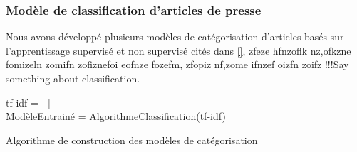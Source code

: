 \begin{enumerate}
                
                
               
                
                
                
                
                
        \end{enumerate}
        \subsubsection{Modèle de classification d'articles de presse}
            Nous avons développé plusieurs modèles de catégorisation d'articles basés sur l'apprentissage supervisé et non supervisé cités dans \autoref{},  zfeze hfnzoflk nz,ofkzne fomizeln zomifn zofiznefoi eofnze fozefm, zfopiz nf,zome ifnzef oizfn zoifz !!!Say something about classification.

            \begin{algorithm2e}[H]
            \SetAlgoLined
            tf-idf = [ ]\\
            ModèleEntrainé = AlgorithmeClassification(tf-idf)\\
            \caption{Algorithme de construction des modèles de catégorisation}
            \end{algorithm2e}

